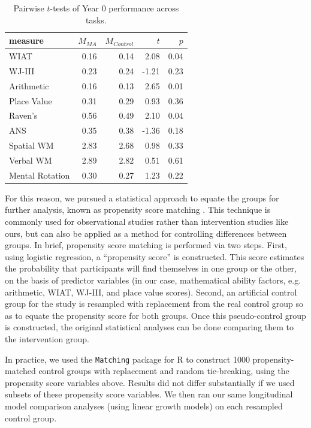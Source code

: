 \documentclass[11pt]{article}
\begin{document}
\begin{table}[ht]
\centering
\caption{\label{tab:pairwise} Pairwise $t$-tests of Year 0 performance across tasks.}
\begin{tabular}{lrrrr}
  \hline
measure & $M_{MA}$ & $M_{Control}$ & $t$ & $p$ \\
  \hline
WIAT & 0.16 & 0.14 & 2.08 & 0.04 \\
WJ-III & 0.23 & 0.24 & -1.21 & 0.23 \\
Arithmetic & 0.16 & 0.13 & 2.65 & 0.01 \\
Place Value & 0.31 & 0.29 & 0.93 & 0.36 \\
Raven's & 0.56 & 0.49 & 2.10 & 0.04 \\
ANS & 0.35 & 0.38 & -1.36 & 0.18 \\
Spatial WM & 2.83 & 2.68 & 0.98 & 0.33 \\
Verbal WM & 2.89 & 2.82 & 0.51 & 0.61 \\
Mental Rotation & 0.30 & 0.27 & 1.23 & 0.22 \\
   \hline
\end{tabular}
\end{table}

For this reason, we pursued a statistical approach to equate the groups for further analysis, known as propensity score matching \cite{rosenbaum1983,sekhon2008}. This technique is commonly used for observational studies rather than intervention studies like ours, but can also be applied as a method for controlling differences between groups. In brief, propensity score matching is performed via two steps. First, using logistic regression, a ``propensity score'' is constructed. This score estimates the probability that participants will find themselves in one group or the other, on the basis of predictor variables (in our case, mathematical ability factors, e.g. arithmetic, WIAT, WJ-III, and place value scores). Second, an artificial control group for the study is resampled with replacement from the real control group so as to equate the propensity score for both groups. Once this pseudo-control group is constructed, the original statistical analyses can be done comparing them to the intervention group.

In practice, we used the \texttt{Matching} package for R \cite{sekhon2008} to construct 1000 propensity-matched control groups with replacement and random tie-breaking, using the propensity score variables above. Results did not differ substantially if we used subsets of these propensity score variables. We then ran our same longitudinal model comparison analyses (using linear growth models) on each resampled control group.
\end{document}
